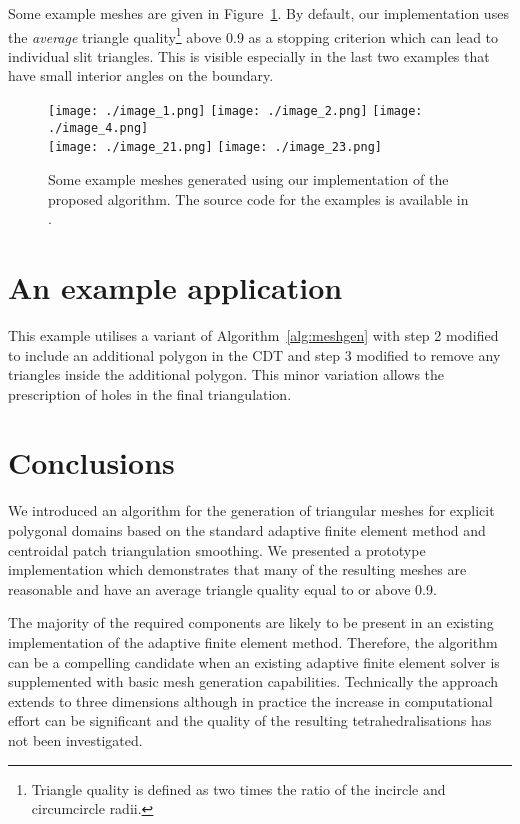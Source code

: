 \documentclass[11pt]{article}
\begin{document}
Some example meshes are given in Figure~\ref{fig:moreexamples}.  By
default, our implementation uses the \emph{average} triangle quality\footnote{Triangle
quality is defined as two times the ratio of the incircle and circumcircle
radii.} above 0.9 as a stopping criterion which can lead to individual slit triangles.
This is visible especially in the last two examples that have small
interior angles on the boundary.

\begin{figure}[htbp]
  \centering
  \texttt{[image: ./image\_1.png]}
  \texttt{[image: ./image\_2.png]}
  \texttt{[image: ./image\_4.png]}\\
  \texttt{[image: ./image\_21.png]}
  \texttt{[image: ./image\_23.png]}
  \caption{Some example meshes generated using our
    implementation of the proposed algorithm.
  The source code for the examples is available in \cite{tomgustafsson_2020}.}
\label{fig:moreexamples}
\end{figure}

\section{An example application}

This example utilises a variant of Algorithm~\ref{alg:meshgen} with step 2
modified to include an additional polygon in the CDT and step 3 modified to
remove any triangles inside the additional polygon.  This minor variation
allows the prescription of holes in the final triangulation.

\section{Conclusions}
\label{sec:org615e973}

We introduced an algorithm for the generation of triangular meshes for explicit
polygonal domains based on the standard adaptive finite element method and
centroidal patch triangulation smoothing.  We presented a prototype
implementation which demonstrates that many of the resulting
meshes are reasonable and have an average triangle quality equal to or above
0.9.

The majority of the required components are likely to be present in an
existing implementation of the adaptive finite element method.  Therefore, the algorithm
can be a compelling candidate when an existing adaptive finite element solver is
supplemented with basic mesh generation capabilities.
Technically the approach extends to three dimensions although in practice the
increase in computational effort can be significant and the quality of the
resulting tetrahedralisations has not been investigated.



\end{document}
